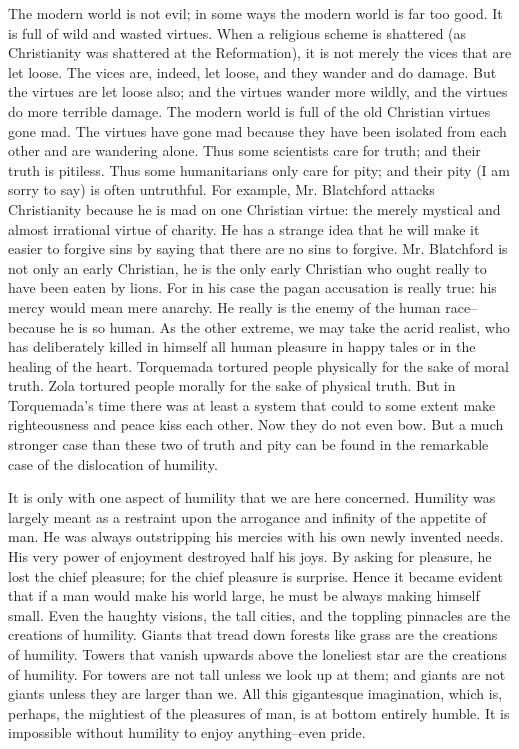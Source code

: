\documentclass{book}
\begin{document}
The modern world is not evil; in some ways the modern world is far too good. It is full of wild and wasted virtues. When a religious scheme is shattered (as Christianity was shattered at the Reformation), it is not merely the vices that are let loose. The vices are, indeed, let loose, and they wander and do damage. But the virtues are let loose also; and the virtues wander more wildly, and the virtues do more terrible damage. The modern world is full of the old Christian virtues gone mad. The virtues have gone mad because they have been isolated from each other and are wandering alone. Thus some scientists care for truth; and their truth is pitiless. Thus some humanitarians only care for pity; and their pity (I am sorry to say) is often untruthful. For example, Mr. Blatchford attacks Christianity because he is mad on one Christian virtue: the merely mystical and almost irrational virtue of charity. He has a strange idea that he will make it easier to forgive sins by saying that there are no sins to forgive. Mr. Blatchford is not only an early Christian, he is the only early Christian who ought really to have been eaten by lions. For in his case the pagan accusation is really true: his mercy would mean mere anarchy. He really is the enemy of the human race–because he is so human. As the other extreme, we may take the acrid realist, who has deliberately killed in himself all human pleasure in happy tales or in the healing of the heart. Torquemada tortured people physically for the sake of moral truth. Zola tortured people morally for the sake of physical truth. But in Torquemada’s time there was at least a system that could to some extent make righteousness and peace kiss each other. Now they do not even bow. But a much stronger case than these two of truth and pity can be found in the remarkable case of the dislocation of humility.

It is only with one aspect of humility that we are here concerned. Humility was largely meant as a restraint upon the arrogance and infinity of the appetite of man. He was always outstripping his mercies with his own newly invented needs. His very power of enjoyment destroyed half his joys. By asking for pleasure, he lost the chief pleasure; for the chief pleasure is surprise. Hence it became evident that if a man would make his world large, he must be always making himself small. Even the haughty visions, the tall cities, and the toppling pinnacles are the creations of humility. Giants that tread down forests like grass are the creations of humility. Towers that vanish upwards above the loneliest star are the creations of humility. For towers are not tall unless we look up at them; and giants are not giants unless they are larger than we. All this gigantesque imagination, which is, perhaps, the mightiest of the pleasures of man, is at bottom entirely humble. It is impossible without humility to enjoy anything–even pride.
\end{document}

